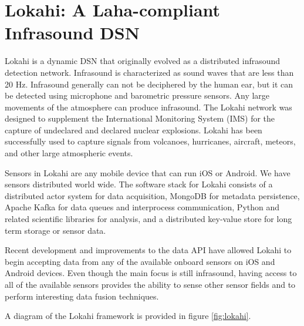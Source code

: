\section{Lokahi: A Laha-compliant Infrasound DSN}
Lokahi is a dynamic DSN that originally evolved as a distributed infrasound detection network. Infrasound is characterized as sound waves that are less than 20 Hz. Infrasound generally can not be deciphered by the human ear, but it can be detected using microphone and barometric pressure sensors. Any large movements of the atmosphere can produce infrasound. The Lokahi network was designed to supplement the International Monitoring System (IMS) for the capture  of undeclared and declared nuclear explosions. Lokahi has been successfully used to capture signals from volcanoes, hurricanes, aircraft, meteors, and other large atmospheric events. 

Sensors in Lokahi are any mobile device that can run iOS or Android. We have sensors distributed world wide. The software stack for Lokahi consists of a distributed actor system for data acquisition, MongoDB for metadata persistence, Apache Kafka for data queues and interprocess communication, Python and related scientific libraries for analysis, and a distributed key-value store for long term storage or sensor data.

Recent development and improvements to the data API have allowed Lokahi to begin accepting data from any of the available onboard sensors on iOS and Android devices. Even though the main focus is still infrasound, having access to all of the available sensors provides the ability to sense other sensor fields and to perform interesting data fusion techniques. 

A diagram of the Lokahi framework is provided in figure \ref{fig:lokahi}.


